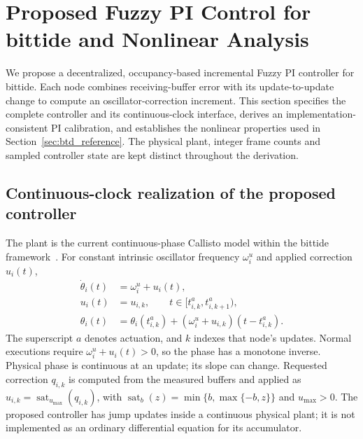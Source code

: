 \section{Proposed Fuzzy PI Control for bittide and Nonlinear Analysis}
\label{sec:fpi_controller}
We propose a decentralized, occupancy-based incremental Fuzzy PI controller
for bittide. Each node combines receiving-buffer error with its
update-to-update change to compute an oscillator-correction increment.
This section specifies the complete controller and its continuous-clock
interface, derives an implementation-consistent PI calibration, and
establishes the nonlinear properties used in
Section~\ref{sec:btd_reference}. The physical plant, integer frame counts
and sampled controller state are kept distinct throughout the derivation.

\subsection{Continuous-clock realization of the proposed controller}

\label{subsec:fpi_laws}
The plant is the current continuous-phase Callisto model within the bittide
framework~\cite{lall2024logicalSynchrony}. For constant
intrinsic oscillator frequency $\omega_i^u$ and applied correction $u_i(t)$,
\begin{align}
 \dot\theta_i(t)&=\omega_i^u+u_i(t),\nonumber\\
 u_i(t)&=u_{i,k},\qquad t\in[t^a_{i,k},t^a_{i,k+1}),\nonumber\\
 \theta_i(t)&=\theta_i(t^a_{i,k})+
       (\omega_i^u+u_{i,k})(t-t^a_{i,k}).
 \label{eq:fpi_continuous_plant}
\end{align}
The superscript $a$ denotes actuation, and $k$ indexes that node's updates.
Normal executions require $\omega_i^u+u_i(t)>0$, so the phase has a
monotone inverse. Physical phase is continuous at an update; its slope can change. Requested
correction $q_{i,k}$ is computed from the measured buffers and applied as
$u_{i,k}=\operatorname{sat}_{u_{\max}}(q_{i,k})$, with
$\operatorname{sat}_b(z)=\min\{b,\max\{-b,z\}\}$ and $u_{\max}>0$.
The proposed controller has jump updates inside a continuous physical plant;
it is not implemented as an ordinary differential equation for its accumulator.


